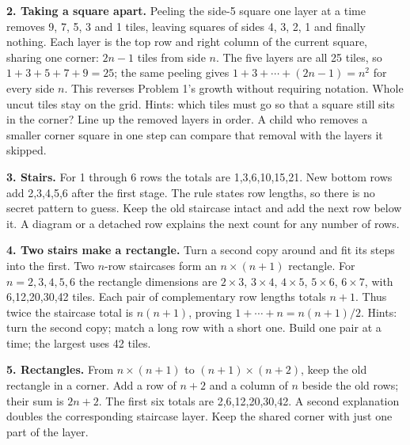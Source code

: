 \documentclass[11pt]{article}
\begin{document}
\textbf{2. Taking a square apart.} Peeling the side-5 square one layer at a time removes 9, 7, 5, 3 and 1 tiles, leaving squares of sides 4, 3, 2, 1 and finally nothing. Each layer is the top row and right column of the current square, sharing one corner: $2n-1$ tiles from side $n$. The five layers are all 25 tiles, so $1+3+5+7+9=25$; the same peeling gives $1+3+\cdots+(2n-1)=n^2$ for every side $n$. This reverses Problem 1's growth without requiring notation. Whole uncut tiles stay on the grid. Hints: which tiles must go so that a square still sits in the corner? Line up the removed layers in order. A child who removes a smaller corner square in one step can compare that removal with the layers it skipped.

\textbf{3. Stairs.} For 1 through 6 rows the totals are 1,3,6,10,15,21. New bottom rows add 2,3,4,5,6 after the first stage. The rule states row lengths, so there is no secret pattern to guess. Keep the old staircase intact and add the next row below it. A diagram or a detached row explains the next count for any number of rows.

\textbf{4. Two stairs make a rectangle.} Turn a second copy around and fit its steps into the first. Two $n$-row staircases form an $n\times(n+1)$ rectangle. For $n=2,3,4,5,6$ the rectangle dimensions are $2\times 3$, $3\times 4$, $4\times 5$, $5\times 6$, $6\times 7$, with 6,12,20,30,42 tiles. Each pair of complementary row lengths totals $n+1$. Thus twice the staircase total is $n(n+1)$, proving $1+\cdots+n=n(n+1)/2$. Hints: turn the second copy; match a long row with a short one. Build one pair at a time; the largest uses 42 tiles.

\textbf{5. Rectangles.} From $n\times(n+1)$ to $(n+1)\times(n+2)$, keep the old rectangle in a corner. Add a row of $n+2$ and a column of $n$ beside the old rows; their sum is $2n+2$. The first six totals are 2,6,12,20,30,42. A second explanation doubles the corresponding staircase layer. Keep the shared corner with just one part of the layer.
\end{document}
